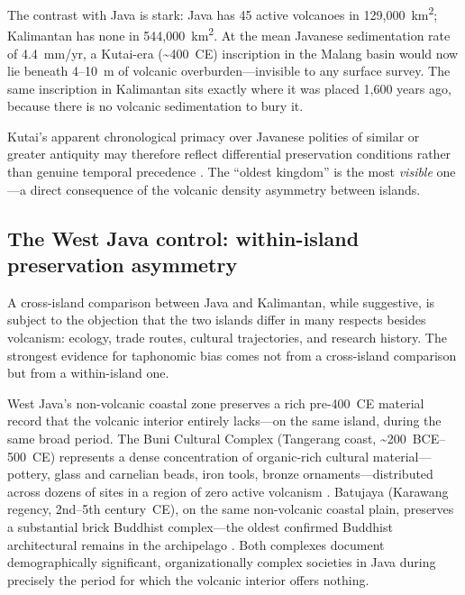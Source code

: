 \documentclass[12pt,a4paper]{article}
\begin{document}
The contrast with Java is stark: Java has 45 active volcanoes in 129,000~km\textsuperscript{2}; Kalimantan has none in 544,000~km\textsuperscript{2}. At the mean Javanese sedimentation rate of 4.4~mm/yr, a Kutai-era (\textasciitilde400~CE) inscription in the Malang basin would now lie beneath 4--10~m of volcanic overburden---invisible to any surface survey. The same inscription in Kalimantan sits exactly where it was placed 1,600 years ago, because there is no volcanic sedimentation to bury it.

Kutai's apparent chronological primacy over Javanese polities of similar or greater antiquity may therefore reflect differential preservation conditions rather than genuine temporal precedence \citep{coedes1968,miksic2004}. The ``oldest kingdom'' is the most \textit{visible} one---a direct consequence of the volcanic density asymmetry between islands.

\subsection{The West Java control: within-island preservation asymmetry}

A cross-island comparison between Java and Kalimantan, while suggestive, is subject to the objection that the two islands differ in many respects besides volcanism: ecology, trade routes, cultural trajectories, and research history. The strongest evidence for taphonomic bias comes not from a cross-island comparison but from a within-island one.

West Java's non-volcanic coastal zone preserves a rich pre-400~CE material record that the volcanic interior entirely lacks---on the same island, during the same broad period. The Buni Cultural Complex (Tangerang coast, \textasciitilde200~BCE--500~CE) represents a dense concentration of organic-rich cultural material---pottery, glass and carnelian beads, iron tools, bronze ornaments---distributed across dozens of sites in a region of zero active volcanism \citep{wibisono1994,bellina2014}. Batujaya (Karawang regency, 2nd--5th century~CE), on the same non-volcanic coastal plain, preserves a substantial brick Buddhist complex---the oldest confirmed Buddhist architectural remains in the archipelago \citep{manguin2011}. Both complexes document demographically significant, organizationally complex societies in Java during precisely the period for which the volcanic interior offers nothing.
\end{document}
